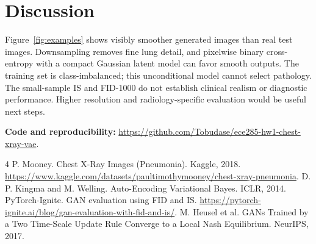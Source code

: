 \documentclass{article}
\begin{document}
\section{Discussion}
Figure~\ref{fig:examples} shows visibly smoother generated images than real
test images. Downsampling removes fine lung detail, and pixelwise binary
cross-entropy with a compact Gaussian latent model can favor smooth outputs.
The training set is class-imbalanced; this unconditional model cannot select
pathology. The small-sample IS and FID-1000 do not establish clinical realism
or diagnostic performance. Higher resolution and
radiology-specific evaluation would be useful next steps.

\noindent\textbf{Code and reproducibility:}
\url{https://github.com/Tobudase/ece285-hw1-chest-xray-vae}.

\small
\begin{thebibliography}{4}
 P. Mooney. Chest X-Ray Images (Pneumonia). Kaggle, 2018.
\url{https://www.kaggle.com/datasets/paultimothymooney/chest-xray-pneumonia}.
 D. P. Kingma and M. Welling. Auto-Encoding Variational Bayes. ICLR, 2014.
 PyTorch-Ignite. GAN evaluation using FID and IS.
\url{https://pytorch-ignite.ai/blog/gan-evaluation-with-fid-and-is/}.
 M. Heusel et al. GANs Trained by a Two Time-Scale Update Rule
Converge to a Local Nash Equilibrium. NeurIPS, 2017.
\end{thebibliography}
\end{document}
